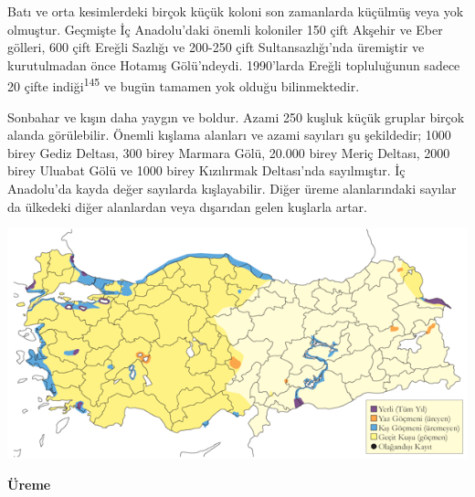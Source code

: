 \documentclass[
  letterpaper,
  DIV=11,
  numbers=noendperiod]{scrreprt}
\begin{document}
Batı ve orta kesimlerdeki birçok küçük koloni son zamanlarda küçülmüş
veya yok olmuştur. Geçmişte İç Anadolu'daki önemli koloniler 150 çift
Akşehir ve Eber gölleri, 600 çift Ereğli Sazlığı ve 200-250 çift
Sultansazlığı'nda üremiştir ve kurutulmadan önce Hotamış Gölü'ndeydi.
1990'larda Ereğli topluluğunun sadece 20 çifte
indiği\textsuperscript{145} ve bugün tamamen yok olduğu bilinmektedir.

Sonbahar ve kışın daha yaygın ve boldur. Azami 250 kuşluk küçük gruplar
birçok alanda görülebilir. Önemli kışlama alanları ve azami sayıları şu
şekildedir; 1000 birey Gediz Deltası, 300 birey Marmara Gölü, 20.000
birey Meriç Deltası, 2000 birey Uluabat Gölü ve 1000 birey Kızılırmak
Deltası'nda sayılmıştır. İç Anadolu'da kayda değer sayılarda
kışlayabilir. Diğer üreme alanlarındaki sayılar da ülkedeki diğer
alanlardan veya dışarıdan gelen kuşlarla artar.

\includegraphics{images/harita_Page_077.png}

\textbf{Üreme}
\end{document}
